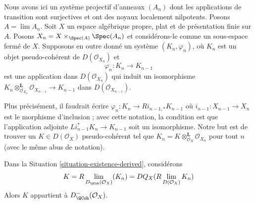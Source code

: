 \begin{situation}
\label{situation-existence-derived}
Nous avons ici un système projectif d'anneaux $(A_n)$ dont les applications
de transition sont surjectives et ont des noyaux localement nilpotents. Posons $A = \lim A_n$. Soit
$X$ un espace algébrique propre, plat et de présentation finie sur $A$.
Posons $X_n = X \times_{\Spec(A)} \Spec(A_n)$ et considérons-le
comme un sous-espace fermé de $X$. Supposons en outre donné un système
$(K_n, \varphi_n)$, où $K_n$ est un objet pseudo-cohérent de
$D(\mathcal{O}_{X_n})$ et
$$
\varphi_n : K_n \longrightarrow K_{n - 1}
$$
est une application dans $D(\mathcal{O}_{X_n})$ qui induit un isomorphisme
$K_n \otimes_{\mathcal{O}_{X_n}}^\mathbf{L} \mathcal{O}_{X_{n - 1}}
\to K_{n - 1}$ dans $D(\mathcal{O}_{X_{n - 1}})$.
\end{situation}

\noindent
Plus précisément, il faudrait écrire
$\varphi_n : K_n \to Ri_{n - 1, *}K_{n - 1}$
où $i_{n - 1} : X_{n - 1} \to X_n$ est le morphisme d'inclusion ;
avec cette notation, la condition est que l'application adjointe
$Li_{n - 1}^*K_n \to K_{n - 1}$ soit un isomorphisme.
Notre but est de trouver un $K \in D(\mathcal{O}_X)$ pseudo-cohérent
tel que $K_n = K \otimes_{\mathcal{O}_X}^\mathbf{L} \mathcal{O}_{X_n}$
pour tout $n$ (avec le même abus de notation).

\begin{lemma}
\label{lemma-compute-what-it-should-be-derived}
Dans la Situation \ref{situation-existence-derived}, considérons
$$
K = R\lim_{D_\QCoh(\mathcal{O}_X)}(K_n) =
DQ_X(R\lim_{D(\mathcal{O}_X)} K_n)
$$
Alors $K$ appartient à $D^-_{\QCoh}(\mathcal{O}_X)$.
\end{lemma}

